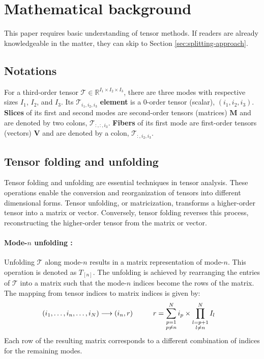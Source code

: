 \documentclass{article}
\begin{document}
\section{Mathematical background}
\label{sec:mathematical-background}
This paper requires basic understanding of tensor methods. If readers are already knowledgeable in the matter, they can skip to Section \ref{sec:splitting-approach}.
\subsection{Notations}
\label{subsec:notations}

For a third-order tensor $ \mathcal{T} \in \mathbb{R}^{I_1\times I_2\times I_3}$, there are three modes with respective sizes $I_1$, $I_2$, and $I_3$. 
Its $\mathcal{T}_{i_1, i_2, i_3}$ 
\textbf{element}
is a 0-order tensor (scalar), $(i_1, i_2, i_3)$. 
\textbf{Slices} of its first and second modes are second-order tensors (matrices) $\mathbf{M}$ and are denoted by two colons, $\mathcal{T}_{:,:,i_3}$. 
\textbf{Fibers} of its first mode are first-order tensors (vectors) $\mathbf{V}$ and are denoted by a colon, $\mathcal{T}_{:, i_2, i_3}$.

\subsection{Tensor folding and unfolding}
\label{subsec:tensor-folding-unfolding}

Tensor folding and unfolding are essential techniques in tensor analysis. These operations enable the conversion and reorganization of tensors into different dimensional forms. Tensor unfolding, or matricization, transforms a higher-order tensor into a matrix or vector. Conversely, tensor folding reverses this process, reconstructing the higher-order tensor from the matrix or vector.

\paragraph{Mode-$n$ unfolding :}
\label{par:mode-n-unfolding}

Unfolding $\mathcal{T}$ along mode-$n$ \cite{r4} results in a matrix representation of mode-$n$. This operation is denoted as $T_{[n]}$. The unfolding is achieved by rearranging the entries of $\mathcal{T}$ into a matrix such that the mode-$n$ indices become the rows of the matrix. The mapping from tensor indices to matrix indices is given by:
\begin{align}
	\label{eq:unfolding}
	&(i_1, \dots, i_n,\dots,i_N) \longrightarrow (i_n,r) \hspace{10mm} r = \sum_{\substack{p=1 \\ p\neq n}}^{N} i_p \times \prod_{\substack{l=p+1 \\ l\neq n}}^{N} I_l
\end{align}
Each row of the resulting matrix corresponds to a different combination of indices for the remaining modes.
\end{document}

